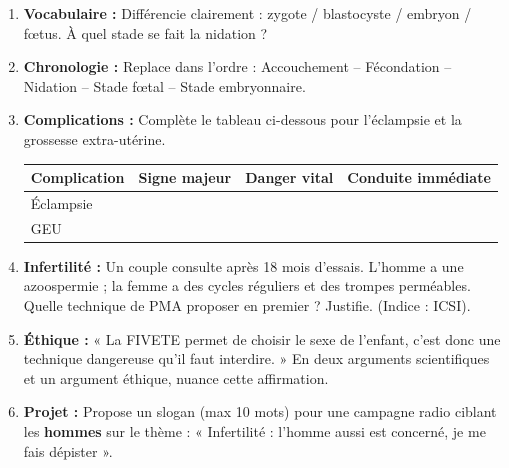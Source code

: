 \documentclass[11pt]{article}
\begin{document}
\begin{exercice}
\begin{enumerate}
\item \textbf{Vocabulaire :} Différencie clairement : zygote / blastocyste / embryon / fœtus. À quel stade se fait la nidation ?
\item \textbf{Chronologie :} Replace dans l'ordre : Accouchement -- Fécondation -- Nidation -- Stade fœtal -- Stade embryonnaire.
\item \textbf{Complications :} Complète le tableau ci-dessous pour l'éclampsie et la grossesse extra-utérine.
\begin{center}
\begin{tabularx}{\linewidth}{|l|X|X|X|}
\hline
\rowcolor{popblueL} \textbf{Complication} & \textbf{Signe majeur} & \textbf{Danger vital} & \textbf{Conduite immédiate} \\
\hline
Éclampsie & & & \\
\hline
GEU & & & \\
\hline
\end{tabularx}
\end{center}
\item \textbf{Infertilité :} Un couple consulte après 18 mois d'essais. L'homme a une azoospermie ; la femme a des cycles réguliers et des trompes perméables. Quelle technique de PMA proposer en premier ? Justifie. (Indice : ICSI).
\item \textbf{Éthique :} « La FIVETE permet de choisir le sexe de l'enfant, c'est donc une technique dangereuse qu'il faut interdire. » En deux arguments scientifiques et un argument éthique, nuance cette affirmation.
\item \textbf{Projet :} Propose un slogan (max 10 mots) pour une campagne radio ciblant les \textbf{hommes} sur le thème : « Infertilité : l'homme aussi est concerné, je me fais dépister ».
\end{enumerate}
\end{exercice}
\end{document}
